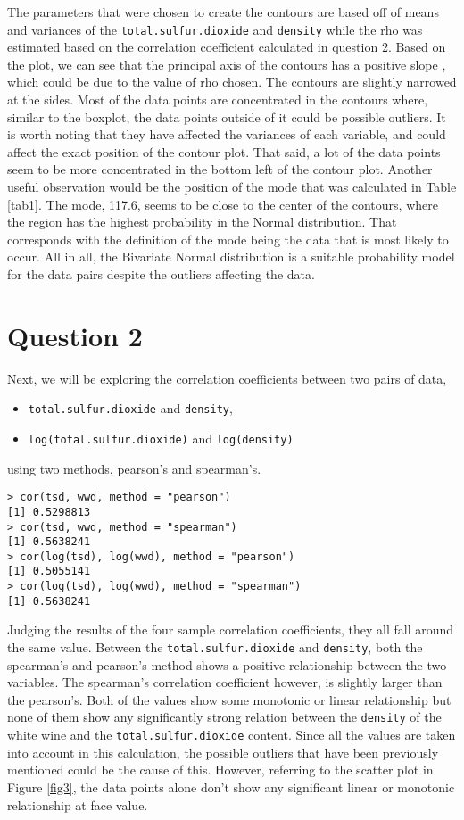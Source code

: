 \documentclass[11pt,a4]{article}
\begin{document}
The parameters that were chosen to create the contours are based off of means and variances of the \verb|total.sulfur.dioxide| and \verb|density| while the rho was estimated based on the correlation coefficient calculated in question 2. Based on the plot, we can see that the principal axis of the contours has a positive slope , which could be due to the value of rho chosen. The contours are slightly narrowed at the sides. Most of the data points are concentrated in the contours where, similar to the boxplot, the data points outside of it could be possible outliers. It is worth noting that they have affected the variances of each variable, and could affect the exact position of the contour plot. That said, a lot of the data points seem to be more concentrated in the bottom left of the contour plot. Another useful observation would be the position of the mode that was calculated in Table \ref{tab1}. The mode, 117.6, seems to be close to the center of the contours, where the region has the highest probability in the Normal distribution. That corresponds with the definition of the mode being the data that is most likely to occur. All in all, the Bivariate Normal distribution is a suitable probability model for the data pairs despite the outliers affecting the data.

\bigskip

\section{Question 2}
Next, we will be exploring the correlation coefficients between two pairs of data, 
\begin{itemize}
    \item \verb|total.sulfur.dioxide| and \verb|density|, 
    \item \verb|log(total.sulfur.dioxide)| and \verb|log(density)| 
\end{itemize}

using two methods, pearson’s and spearman’s.

\begin{verbatim}
> cor(tsd, wwd, method = "pearson")
[1] 0.5298813
> cor(tsd, wwd, method = "spearman")
[1] 0.5638241
> cor(log(tsd), log(wwd), method = "pearson")
[1] 0.5055141
> cor(log(tsd), log(wwd), method = "spearman")
[1] 0.5638241
\end{verbatim}

Judging the results of the four sample correlation coefficients, they all fall around the same value. Between the \verb|total.sulfur.dioxide| and \verb|density|, both the spearman’s and pearson’s method shows a positive relationship between the two variables. The spearman’s correlation coefficient however, is slightly larger than the pearson’s. Both of the values show some monotonic or linear relationship but none of them show any significantly strong relation between the \verb|density| of the white wine and the \verb|total.sulfur.dioxide| content. Since all the values are taken into account in this calculation, the possible outliers that have been previously mentioned could be the cause of this. However, referring to the scatter plot in Figure \ref{fig3}, the data points alone don’t show any significant linear or monotonic relationship at face value. 
\end{document}
